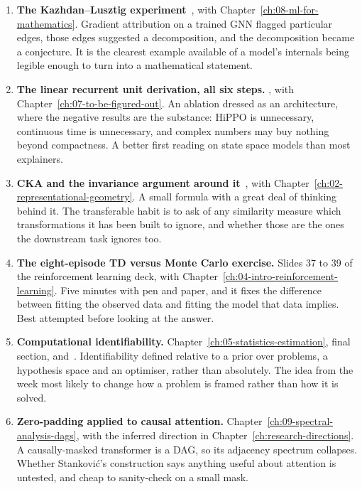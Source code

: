 \begin{enumerate}
\item \textbf{The Kazhdan--Lusztig experiment}~\citep{davies2021}, with
  Chapter~\ref{ch:08-ml-for-mathematics}. Gradient attribution on a trained GNN flagged particular
  edges, those edges suggested a decomposition, and the decomposition became a conjecture. It is the
  clearest example available of a model's internals being legible enough to turn into a mathematical
  statement.

\item \textbf{The linear recurrent unit derivation, all six steps.} \citet{orvieto2023}, with
  Chapter~\ref{ch:07-to-be-figured-out}. An ablation dressed as an architecture, where the negative
  results are the substance: HiPPO is unnecessary, continuous time is unnecessary, and complex
  numbers may buy nothing beyond compactness. A better first reading on state space models than most
  explainers.

\item \textbf{CKA and the invariance argument around it}~\citep{kornblith2019}, with
  Chapter~\ref{ch:02-representational-geometry}. A small formula with a great deal of thinking behind
  it. The transferable habit is to ask of any similarity measure which transformations it has been
  built to ignore, and whether those are the ones the downstream task ignores too.

\item \textbf{The eight-episode TD versus Monte Carlo exercise.} Slides 37 to 39 of the
  reinforcement learning deck, with Chapter~\ref{ch:04-intro-reinforcement-learning}. Five minutes
  with pen and paper, and it fixes the difference between fitting the observed data and fitting the
  model that data implies. Best attempted before looking at the answer.

\item \textbf{Computational identifiability.} Chapter~\ref{ch:05-statistics-estimation}, final
  section, and~\citet{bynum2026identifiability}. Identifiability defined relative to a prior over
  problems, a hypothesis space and an optimiser, rather than absolutely. The idea from the week most
  likely to change how a problem is framed rather than how it is solved.

\item \textbf{Zero-padding applied to causal attention.}
  Chapter~\ref{ch:09-spectral-analysis-dags}, with the inferred direction in
  Chapter~\ref{ch:research-directions}. A causally-masked transformer is a DAG, so its adjacency
  spectrum collapses. Whether Stankovi\'{c}'s construction says anything useful about attention is
  untested, and cheap to sanity-check on a small mask.


\end{enumerate}
